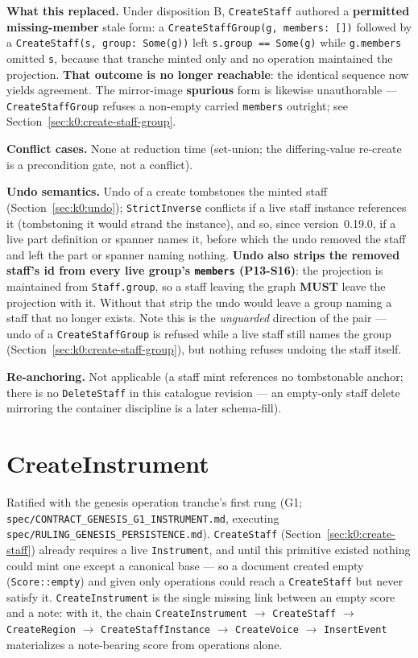 \documentclass[11pt,letterpaper]{report}
\newcommand{\MUST}{\textbf{MUST}}
\begin{document}
\textbf{What this replaced.} Under disposition B, \texttt{CreateStaff} authored
a \textbf{permitted} \textbf{missing-member} stale form: a
\texttt{CreateStaffGroup(g, members: [])} followed by a
\texttt{CreateStaff(s, group: Some(g))} left \texttt{s.group == Some(g)} while
\texttt{g.members} omitted \texttt{s}, because that tranche minted only and no
operation maintained the projection. \textbf{That outcome is no longer
reachable}: the identical sequence now yields agreement. The mirror-image
\textbf{spurious} form is likewise unauthorable --- \texttt{CreateStaffGroup}
refuses a non-empty carried \texttt{members} outright; see
Section~\ref{sec:k0:create-staff-group}.

\textbf{Conflict cases.} None at reduction time (set-union; the differing-value
re-create is a precondition gate, not a conflict).

\textbf{Undo semantics.} Undo of a create tombstones the minted staff
(Section~\ref{sec:k0:undo}); \texttt{StrictInverse} conflicts if a live staff
instance references it (tombstoning it would strand the instance), and so, since
version~0.19.0, if a live part definition or spanner names it, before which the
undo removed the staff and left the part or spanner naming nothing.
\textbf{Undo also strips the removed staff's id from every live group's
\texttt{members} (P13-S16)}: the projection is maintained from
\texttt{Staff.group}, so a staff leaving the graph \MUST{} leave the projection
with it. Without that strip the undo would leave a group naming a staff that no
longer exists. Note this is the \emph{unguarded} direction of the pair --- undo
of a \texttt{CreateStaffGroup} is refused while a live staff still names the
group (Section~\ref{sec:k0:create-staff-group}), but nothing refuses undoing the
staff itself.

\textbf{Re-anchoring.} Not applicable (a staff mint references no tombstonable
anchor; there is no \texttt{DeleteStaff} in this catalogue revision --- an
empty-only staff delete mirroring the container discipline is a later
schema-fill).

\section{CreateInstrument}
\label{sec:k0:create-instrument}

Ratified with the genesis operation tranche's first rung (G1;
\texttt{spec/CONTRACT\_GENESIS\_G1\_INSTRUMENT.md}, executing
\texttt{spec/RULING\_GENESIS\_PERSISTENCE.md}). \texttt{CreateStaff}
(Section~\ref{sec:k0:create-staff}) already requires a live
\texttt{Instrument}, and until this primitive existed nothing could mint one
except a canonical base --- so a document created empty
(\texttt{Score::empty}) and given only operations could reach a
\texttt{CreateStaff} but never satisfy it. \texttt{CreateInstrument} is the
single missing link between an empty score and a note: with it, the chain
\texttt{CreateInstrument} $\rightarrow$ \texttt{CreateStaff} $\rightarrow$
\texttt{CreateRegion} $\rightarrow$ \texttt{CreateStaffInstance}
$\rightarrow$ \texttt{CreateVoice} $\rightarrow$ \texttt{InsertEvent}
materializes a note-bearing score from operations alone.
\end{document}
